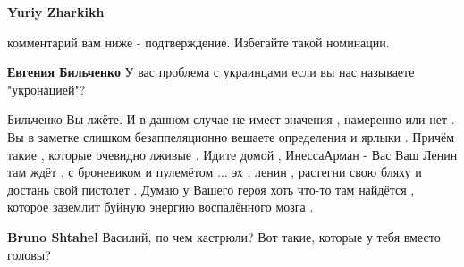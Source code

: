 \begin{itemize}
\begin{itemize}
 
\textbf{Yuriy Zharkikh} 

комментарий вам ниже - подтверждение. Избегайте такой номинации.


 
\textbf{Евгения Бильченко}
У вас проблема с украинцами если вы нас называете "укронацией"?
\end{itemize}

 

Бильченко Вы лжёте. И в данном случае не имеет значения , намеренно или нет .
Вы в заметке слишком безаппеляционно вешаете определения и ярлыки . Причём
такие , которые очевидно лживые . Идите домой , ИнессаАрман - Вас Ваш Ленин там
ждёт , с броневиком и пулемётом ... эх , ленин , растегни свою бляху и достань
свой пистолет . Думаю у Вашего героя хоть что-то там найдётся , которое
заземлит буйную энергию воспалённого мозга .

\begin{itemize}
 
\textbf{Bruno Shtahel} Василий, по чем кастрюли? Вот такие, которые у тебя вместо головы?
\end{itemize}

\end{itemize}

